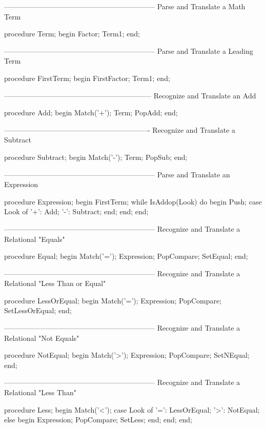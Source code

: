 \documentclass[float=false, crop=false]{standalone}
\begin{document}
\begin{code}
{---------------------------------------------------------------}
{ Parse and Translate a Math Term }

procedure Term;
begin
   Factor;
   Term1;
end;


{---------------------------------------------------------------}
{ Parse and Translate a Leading Term }

procedure FirstTerm;
begin
   FirstFactor;
   Term1;
end;


{--------------------------------------------------------------}
{ Recognize and Translate an Add }

procedure Add;
begin
   Match('+');
   Term;
   PopAdd;
end;


{-------------------------------------------------------------}
{ Recognize and Translate a Subtract }

procedure Subtract;
begin
   Match('-');
   Term;
   PopSub;
end;


{---------------------------------------------------------------}
{ Parse and Translate an Expression }

procedure Expression;
begin
   FirstTerm;
   while IsAddop(Look) do begin
      Push;
      case Look of
       '+': Add;
       '-': Subtract;
      end;
   end;
end;


{---------------------------------------------------------------}
{ Recognize and Translate a Relational "Equals" }

procedure Equal;
begin
   Match('=');
   Expression;
   PopCompare;
   SetEqual;
end;


{---------------------------------------------------------------}
{ Recognize and Translate a Relational "Less Than or Equal" }

procedure LessOrEqual;
begin
   Match('=');
   Expression;
   PopCompare;
   SetLessOrEqual;
end;


{---------------------------------------------------------------}
{ Recognize and Translate a Relational "Not Equals" }

procedure NotEqual;
begin
   Match('>');
   Expression;
   PopCompare;
   SetNEqual;
end;


{---------------------------------------------------------------}
{ Recognize and Translate a Relational "Less Than" }

procedure Less;
begin
   Match('<');
   case Look of
     '=': LessOrEqual;
     '>': NotEqual;
   else begin
           Expression;
           PopCompare;
           SetLess;
        end;
   end;
end;



\end{code}
\end{document}
